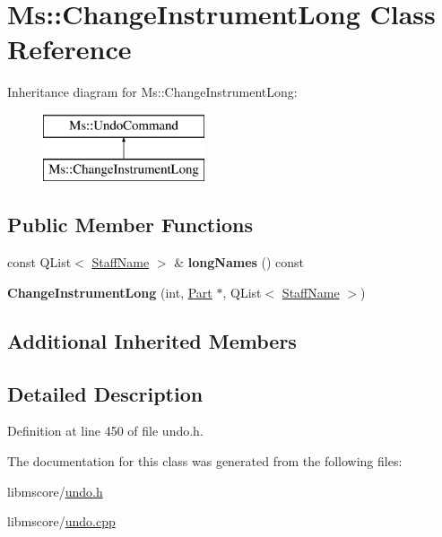 \hypertarget{class_ms_1_1_change_instrument_long}{}\section{Ms\+:\+:Change\+Instrument\+Long Class Reference}
\label{class_ms_1_1_change_instrument_long}
Inheritance diagram for Ms\+:\+:Change\+Instrument\+Long\+:\begin{figure}[H]
\begin{center}
\leavevmode
\includegraphics[height=2.000000cm]{class_ms_1_1_change_instrument_long}
\end{center}
\end{figure}
\subsection*{Public Member Functions}
\begin{DoxyCompactItemize}
\item 
\mbox{\label{class_ms_1_1_change_instrument_long_a9a0acb0c1d44e13477db2435ed248010}} 
const Q\+List$<$ \hyperlink{class_ms_1_1_staff_name}{Staff\+Name} $>$ \& {\bfseries long\+Names} () const
\item 
\mbox{\label{class_ms_1_1_change_instrument_long_a3497b3a415981ec00fba1dce3c33537c}} 
{\bfseries Change\+Instrument\+Long} (int, \hyperlink{class_ms_1_1_part}{Part} $\ast$, Q\+List$<$ \hyperlink{class_ms_1_1_staff_name}{Staff\+Name} $>$)
\end{DoxyCompactItemize}
\subsection*{Additional Inherited Members}


\subsection{Detailed Description}


Definition at line 450 of file undo.\+h.



The documentation for this class was generated from the following files\+:\begin{DoxyCompactItemize}
\item 
libmscore/\hyperlink{undo_8h}{undo.\+h}\item 
libmscore/\hyperlink{undo_8cpp}{undo.\+cpp}\end{DoxyCompactItemize}

